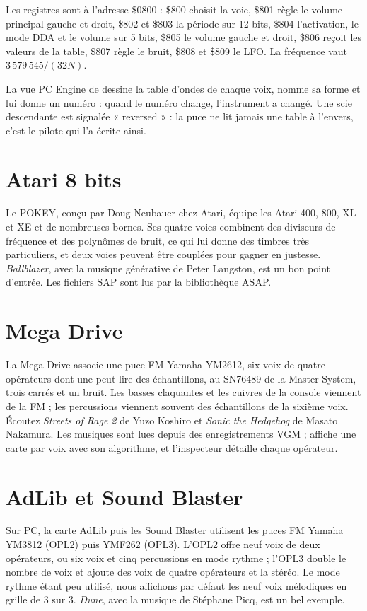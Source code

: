 Les registres sont à l'adresse \$0800 : \$800 choisit la voie, \$801 règle le volume principal gauche et droit,
\$802 et \$803 la période sur 12 bits, \$804 l'activation, le mode DDA et le volume sur 5 bits, \$805 le volume gauche
et droit, \$806 reçoit les valeurs de la table, \$807 règle le bruit, \$808 et \$809 le LFO. La fréquence vaut
$3\,579\,545 / (32N)$.

La vue PC Engine de \soft dessine la table d'ondes de chaque voix, nomme sa forme et lui donne un numéro : quand le
numéro change, l'instrument a changé. Une scie descendante est signalée « reversed » : la puce ne lit jamais une
table à l'envers, c'est le pilote qui l'a écrite ainsi.

\section{Atari 8 bits}
Le POKEY, conçu par Doug Neubauer chez Atari, équipe les Atari 400, 800, XL et XE et de nombreuses bornes. Ses quatre
voies combinent des diviseurs de fréquence et des polynômes de bruit, ce qui lui donne des timbres très particuliers,
et deux voies peuvent être couplées pour gagner en justesse. \emph{Ballblazer}, avec la musique générative de Peter
Langston, est un bon point d'entrée. Les fichiers SAP sont lus par la bibliothèque ASAP.

\section{Mega Drive}
La Mega Drive associe une puce FM Yamaha YM2612, six voix de quatre opérateurs dont une peut lire des échantillons,
au SN76489 de la Master System, trois carrés et un bruit. Les basses claquantes et les cuivres de la console viennent
de la FM ; les percussions viennent souvent des échantillons de la sixième voix. Écoutez \emph{Streets of Rage 2} de
Yuzo Koshiro et \emph{Sonic the Hedgehog} de Masato Nakamura. Les musiques sont lues depuis des enregistrements VGM ;
\soft affiche une carte par voix avec son algorithme, et l'inspecteur détaille chaque opérateur.

\section{AdLib et Sound Blaster}
Sur PC, la carte AdLib puis les Sound Blaster utilisent les puces FM Yamaha YM3812 (OPL2) puis YMF262 (OPL3). L'OPL2
offre neuf voix de deux opérateurs, ou six voix et cinq percussions en mode rythme ; l'OPL3 double le nombre de voix
et ajoute des voix de quatre opérateurs et la stéréo. Le mode rythme étant peu utilisé, nous affichons par défaut les
neuf voix mélodiques en grille de 3 sur 3. \emph{Dune}, avec la musique de Stéphane Picq, est un bel exemple.

